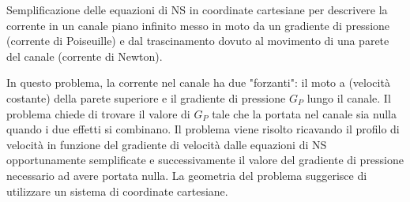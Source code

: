 \sol

\partone
 Semplificazione delle equazioni di NS in coordinate cartesiane per descrivere la corrente in un canale piano infinito messo in moto da un gradiente di pressione (corrente di Poiseuille) e dal trascinamento dovuto al movimento di una parete del canale (corrente di Newton).

\parttwo
In questo problema, la corrente nel canale ha due "forzanti": il moto a (velocità costante) della parete superiore e il gradiente di pressione $G_P$ lungo il canale. Il problema chiede di trovare il valore di $G_P$ tale che la portata nel canale sia nulla quando i due effetti si combinano.
Il problema viene risolto ricavando il profilo di velocità in funzione del gradiente di velocità dalle equazioni di NS opportunamente semplificate e successivamente il valore del gradiente di pressione necessario ad avere portata nulla. La geometria del problema suggerisce di utilizzare un sistema di coordinate cartesiane.

